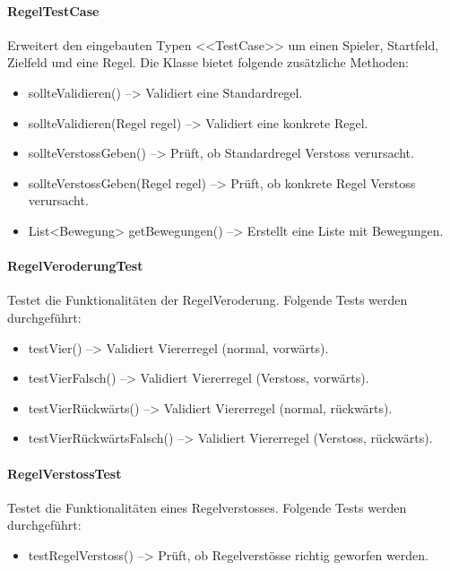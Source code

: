 \documentclass[12pt,halfparskip]{scrartcl}
\begin{document}
		\paragraph{RegelTestCase}\label{ssub:regeltestcase} %
		Erweitert den eingebauten Typen <<TestCase>> um einen Spieler, Startfeld, Zielfeld und eine Regel. Die Klasse bietet folgende zusätzliche Methoden:
		\begin{itemize}
			\item sollteValidieren() --> Validiert eine Standardregel.
			\item sollteValidieren(Regel regel) --> Validiert eine konkrete Regel.
			\item sollteVerstossGeben() --> Prüft, ob Standardregel Verstoss verursacht.
			\item sollteVerstossGeben(Regel regel) --> Prüft, ob konkrete Regel Verstoss verursacht.
			\item List<Bewegung> getBewegungen() --> Erstellt eine Liste mit Bewegungen.
		\end{itemize}
		\paragraph{RegelVeroderungTest}\label{ssub:regelveroderungtest} %
		Testet die Funktionalitäten der RegelVeroderung. Folgende Tests werden durchgeführt:
		\begin{itemize}
			\item testVier() --> Validiert Viererregel (normal, vorwärts).
			\item testVierFalsch() --> Validiert Viererregel (Verstoss, vorwärts).
			\item testVierRückwärts() --> Validiert Viererregel (normal, rückwärts).
			\item testVierRückwärtsFalsch() --> Validiert Viererregel (Verstoss, rückwärts).
		\end{itemize}
		\paragraph{RegelVerstossTest}\label{ssub:regelverstosstest} %
		Testet die Funktionalitäten eines Regelverstosses. Folgende Tests werden durchgeführt:
		\begin{itemize}
			\item testRegelVerstoss() --> Prüft, ob Regelverstösse richtig geworfen werden.
		\end{itemize}
\end{document}
